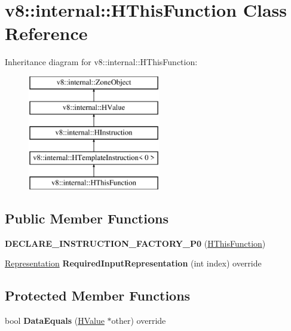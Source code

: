 \hypertarget{classv8_1_1internal_1_1_h_this_function}{}\section{v8\+:\+:internal\+:\+:H\+This\+Function Class Reference}
\label{classv8_1_1internal_1_1_h_this_function}
Inheritance diagram for v8\+:\+:internal\+:\+:H\+This\+Function\+:\begin{figure}[H]
\begin{center}
\leavevmode
\includegraphics[height=5.000000cm]{classv8_1_1internal_1_1_h_this_function}
\end{center}
\end{figure}
\subsection*{Public Member Functions}
\begin{DoxyCompactItemize}
\item 
{\bfseries D\+E\+C\+L\+A\+R\+E\+\_\+\+I\+N\+S\+T\+R\+U\+C\+T\+I\+O\+N\+\_\+\+F\+A\+C\+T\+O\+R\+Y\+\_\+\+P0} (\hyperlink{classv8_1_1internal_1_1_h_this_function}{H\+This\+Function})\hypertarget{classv8_1_1internal_1_1_h_this_function_a018516be05ac43e5716b07db85e77b7c}{}\label{classv8_1_1internal_1_1_h_this_function_a018516be05ac43e5716b07db85e77b7c}

\item 
\hyperlink{classv8_1_1internal_1_1_representation}{Representation} {\bfseries Required\+Input\+Representation} (int index) override\hypertarget{classv8_1_1internal_1_1_h_this_function_a0a0cacedad65d06819c2c67e03feeb81}{}\label{classv8_1_1internal_1_1_h_this_function_a0a0cacedad65d06819c2c67e03feeb81}

\end{DoxyCompactItemize}
\subsection*{Protected Member Functions}
\begin{DoxyCompactItemize}
\item 
bool {\bfseries Data\+Equals} (\hyperlink{classv8_1_1internal_1_1_h_value}{H\+Value} $\ast$other) override\hypertarget{classv8_1_1internal_1_1_h_this_function_ac3376b44d5df77a62f7d4cef2c73aa2e}{}\label{classv8_1_1internal_1_1_h_this_function_ac3376b44d5df77a62f7d4cef2c73aa2e}

\end{DoxyCompactItemize}
